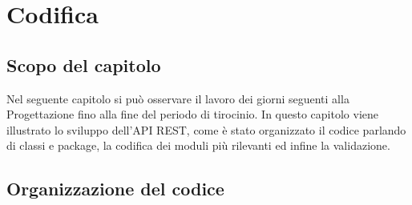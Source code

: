 \chapter{Codifica}
\label{cap:codifica}

\section{Scopo del capitolo}
Nel seguente capitolo si può osservare il lavoro dei giorni seguenti alla Progettazione fino alla fine del periodo di tirocinio. In questo capitolo viene illustrato lo sviluppo dell'API REST, come è stato organizzato il codice parlando di classi e package, la codifica dei moduli più rilevanti ed infine la validazione. \\



\section{Organizzazione del codice}










